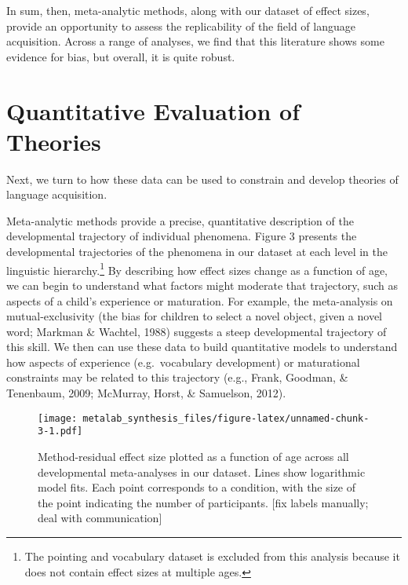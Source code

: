 \documentclass[english,floatsintext,man]{apa6}
\begin{document}
In sum, then, meta-analytic methods, along with our dataset of effect
sizes, provide an opportunity to assess the replicability of the field
of language acquisition. Across a range of analyses, we find that this
literature shows some evidence for bias, but overall, it is quite
robust.

\section{Quantitative Evaluation of
Theories}\label{quantitative-evaluation-of-theories}

Next, we turn to how these data can be used to constrain and develop
theories of language acquisition.

Meta-analytic methods provide a precise, quantitative description of the
developmental trajectory of individual phenomena. Figure 3 presents the
developmental trajectories of the phenomena in our dataset at each level
in the linguistic
hierarchy.\footnote{The pointing and vocabulary dataset is excluded from this analysis because it does not contain effect sizes at multiple ages.}
By describing how effect sizes change as a function of age, we can begin
to understand what factors might moderate that trajectory, such as
aspects of a child's experience or maturation. For example, the
meta-analysis on mutual-exclusivity (the bias for children to select a
novel object, given a novel word; Markman \& Wachtel, 1988) suggests a
steep developmental trajectory of this skill. We then can use these data
to build quantitative models to understand how aspects of experience
(e.g.~vocabulary development) or maturational constraints may be related
to this trajectory (e.g., Frank, Goodman, \& Tenenbaum, 2009; McMurray,
Horst, \& Samuelson, 2012).

\begin{figure}[htbp]
\centering
\texttt{[image: metalab\_synthesis\_files/figure-latex/unnamed-chunk-3-1.pdf]}
\caption{Method-residual effect size plotted as a function of age across
all developmental meta-analyses in our dataset. Lines show logarithmic
model fits. Each point corresponds to a condition, with the size of the
point indicating the number of participants. {[}fix labels manually;
deal with communication{]}}
\end{figure}
\end{document}
